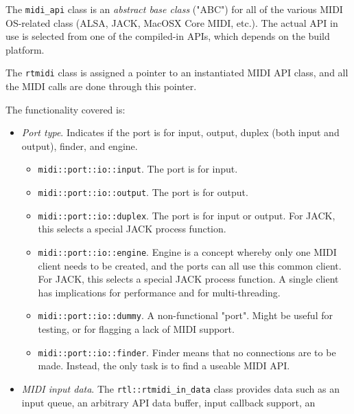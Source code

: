    The \texttt{midi\_api} class is an \textsl{abstract base class}
   ("ABC") for all of the various MIDI OS-related class (ALSA, JACK,
   MacOSX Core MIDI, etc.).
   The actual API in use is selected from one of the compiled-in
   APIs, which depends on the build platform.

   The \texttt{rtmidi} class is assigned a pointer to an instantiated
   MIDI API class, and all the MIDI calls are done through this pointer.

   The functionality covered is:

   \begin{itemize}
      \item \textsl{Port type}.
         Indicates if the port is for input, output,
         duplex (both input and output), finder, and engine.
         \begin{itemize}
            \item \texttt{midi::port::io::input}.
               The port is for input.
            \item \texttt{midi::port::io::output}.
               The port is for output.
            \item \texttt{midi::port::io::duplex}.
               The port is for input or output.
               For JACK, this selects a special JACK process function.
            \item \texttt{midi::port::io::engine}.
               Engine is a concept whereby only one MIDI client needs to be
               created, and the ports can all use this common client.
               For JACK, this selects a special JACK process function.
               A single client has implications for performance and
               for multi-threading.
            \item \texttt{midi::port::io::dummy}.
               A non-functional "port". Might be useful for testing,
               or for flagging a lack of MIDI support.
            \item \texttt{midi::port::io::finder}.
               Finder means that no connections are to be made.
               Instead, the only task is to find a useable MIDI API.
         \end{itemize}
      \item \textsl{MIDI input data}.
         The \texttt{rtl::rtmidi\_in\_data} class provides data such as an
         input queue, an arbitrary API data buffer, input callback support, an

\end{itemize}
